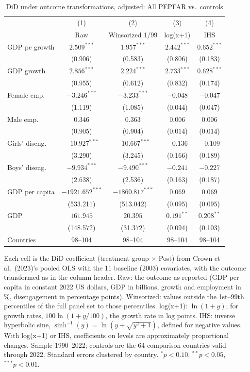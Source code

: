 \begin{table}[htbp]
\centering
\caption{DiD under outcome transformations, adjusted: All PEPFAR vs.\ controls}
\label{tab:crown_did_transform_all_pepfar}
\begin{tabular}{lcccc}
\toprule
 & (1) & (2) & (3) & (4) \\
 & Raw & Winsorized 1/99 & log(x+1) & IHS \\
\midrule
GDP pc growth & $2.509^{***}$ & $1.957^{***}$ & $2.442^{***}$ & $0.652^{***}$ \\
 & (0.906) & (0.583) & (0.806) & (0.183) \\
GDP growth & $2.856^{***}$ & $2.224^{***}$ & $2.733^{***}$ & $0.628^{***}$ \\
 & (0.955) & (0.612) & (0.832) & (0.174) \\
Female emp. & $-3.246^{***}$ & $-3.233^{***}$ & $-0.048$ & $-0.047$ \\
 & (1.119) & (1.085) & (0.044) & (0.047) \\
Male emp. & $0.346$ & $0.363$ & $0.006$ & $0.006$ \\
 & (0.905) & (0.904) & (0.014) & (0.014) \\
Girls' diseng. & $-10.927^{***}$ & $-10.667^{***}$ & $-0.136$ & $-0.109$ \\
 & (3.290) & (3.245) & (0.166) & (0.189) \\
Boys' diseng. & $-9.934^{***}$ & $-9.490^{***}$ & $-0.241$ & $-0.227$ \\
 & (2.638) & (2.536) & (0.163) & (0.187) \\
GDP per capita & $-1921.652^{***}$ & $-1860.817^{***}$ & $0.069$ & $0.069$ \\
 & (533.211) & (513.042) & (0.095) & (0.095) \\
GDP & $161.945$ & $20.395$ & $0.191^{**}$ & $0.208^{**}$ \\
 & (148.572) & (31.372) & (0.094) & (0.103) \\
\midrule
Countries & 98--104 & 98--104 & 98--104 & 98--104 \\
\bottomrule
\end{tabular}
\par\vspace{4pt}
\begin{minipage}{\textwidth}\footnotesize Each cell is the DiD coefficient (treatment group $\times$ Post) from Crown et al.\ (2023)'s pooled OLS with the 11 baseline (2003) covariates, with the outcome transformed as in the column header. Raw: the outcome as reported (GDP per capita in constant 2022 US dollars, GDP in billions, growth and employment in \%, disengagement in percentage points). Winsorized: values outside the 1st--99th percentiles of the full panel set to those percentiles. log(x+1): $\ln(1 + y)$; for growth rates, $100 \ln(1 + y/100)$, the growth rate in log points. IHS: inverse hyperbolic sine, $\sinh^{-1}(y) = \ln(y + \sqrt{y^2 + 1})$, defined for negative values. With log(x+1) or IHS, coefficients on levels are approximately proportional changes. Sample 1990--2022; controls are the 64 comparison countries valid through 2022. Standard errors clustered by country. $^{*}p<0.10$, $^{**}p<0.05$, $^{***}p<0.01$.\end{minipage}
\end{table}
